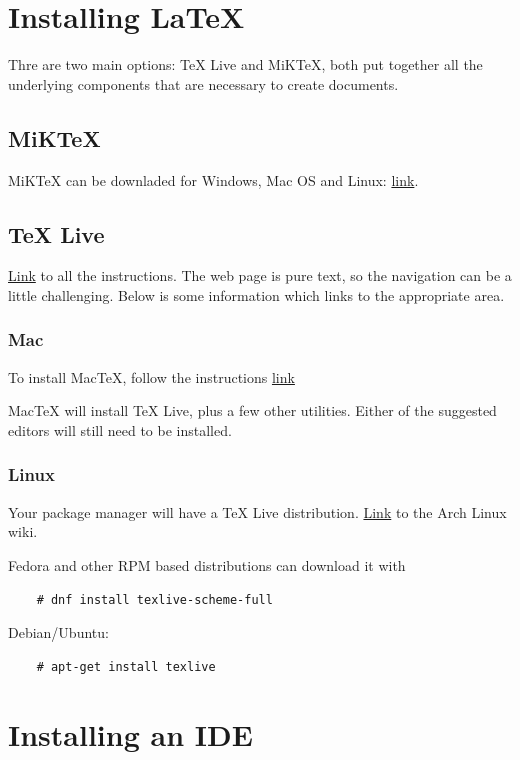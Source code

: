 \section{Installing \LaTeX}
Thre are two main options: TeX Live and MiKTeX, both put together all the underlying components that are necessary to create documents.

\subsection{MiKTeX}
MiKTeX can be downladed for Windows, Mac OS and Linux: \href{https://miktex.org/download}{link}.

\subsection{TeX Live}
\href{https://www.tug.org/texlive/}{Link} to all the instructions.
The web page is pure text, so the navigation can be a little challenging.
Below is some information which links to the appropriate area.

\subsubsection{Mac}
To install MacTeX, follow the instructions \href{https://www.tug.org/mactex/mactex-download.html}{link}

MacTeX will install TeX Live, plus a few other utilities.
Either of the suggested editors will still need to be installed.  

\subsubsection{Linux}
Your package manager will have a TeX Live distribution. \href{https://wiki.archlinux.org/title/TeX_Live}{Link} to the Arch Linux wiki.

Fedora and other RPM based distributions can download it with
\begin{lstlisting}
    # dnf install texlive-scheme-full
\end{lstlisting}

Debian/Ubuntu:
\begin{lstlisting}
    # apt-get install texlive
\end{lstlisting}

\section{Installing an IDE}
